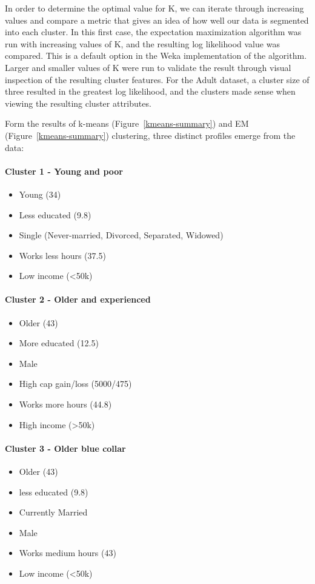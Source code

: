 \documentclass{sig-alternate}
\begin{document}

In order to determine the optimal value for K, we can iterate through increasing values and compare a metric that gives an idea of how well our data is segmented into each cluster. In this first case, the expectation maximization algorithm was run with increasing values of K, and the resulting log likelihood value was compared. This is a default option in the Weka implementation of the algorithm. Larger and smaller values of K were run to validate the result through visual inspection of the resulting cluster features. For the Adult dataset, a cluster size of three resulted in the greatest log likelihood, and the clusters made sense when viewing the resulting cluster attributes.

Form the results of k-means (Figure~\ref{kmeans-summary}) and EM (Figure~\ref{kmeans-summary}) clustering, three distinct profiles emerge from the data:

\paragraph{Cluster 1 - Young and poor}
\begin{itemize}[itemsep=1pt]
    \item Young (34)
    \item Less educated (9.8)
    \item Single (Never-married, Divorced, Separated, Widowed)
    \item Works less hours (37.5)
    \item Low income (<50k)
\end{itemize}

\paragraph{Cluster 2 - Older and experienced}
\begin{itemize}[itemsep=1pt]
    \item Older (43)
    \item More educated (12.5)
    \item Male
    \item High cap gain/loss (5000/475)
    \item Works more hours (44.8)
    \item High income (>50k)
\end{itemize}

\paragraph{Cluster 3 - Older blue collar}
\begin{itemize}[itemsep=1pt]
    \item Older (43)
    \item less educated (9.8)
    \item Currently Married
    \item Male
    \item Works medium hours (43)
    \item Low income (<50k)
\end{itemize}
\end{document}
